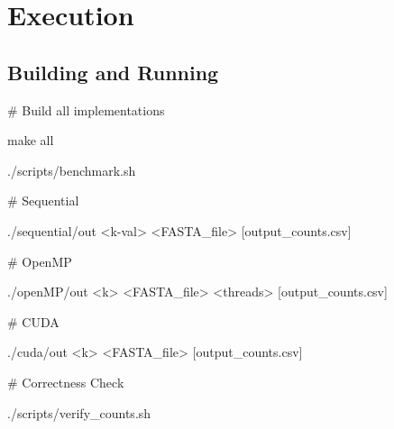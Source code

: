 \documentclass{article}
\begin{document}
\section{Execution}

\vspace{\baselineskip}

\subsection{Building and Running}

\vspace{\baselineskip}

\begin{center}
\begin{tcolorbox}[
    colback=gray!8,
    colframe=gray!25,
    arc=3mm,
    boxrule=0.4pt,
    width=0.85\textwidth,
    left=10pt,
    right=10pt,
    top=8pt,
    bottom=8pt
]
\ttfamily
\# Build all implementations

\vspace{6pt} 

make all

\vspace{12pt}

./scripts/benchmark.sh

\vspace{6pt}

\# Sequential
\vspace{6pt}

./sequential/out <k-val> <FASTA\_file> [output\_counts.csv]

\vspace{12pt}

\# OpenMP
\vspace{6pt}

./openMP/out <k> <FASTA\_file> <threads> [output\_counts.csv]

\vspace{12pt}

\# CUDA
\vspace{6pt}

./cuda/out <k> <FASTA\_file> [output\_counts.csv]

\vspace{12pt}

\# Correctness Check
\vspace{6pt}

./scripts/verify\_counts.sh

\end{tcolorbox}
\end{center}
\end{document}
